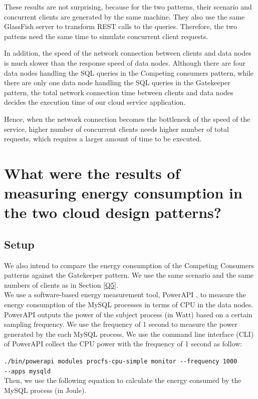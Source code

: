 \documentclass{article}
\begin{document}
These results are not surprising, because for the two patterns, their scenario and concurrent clients are generated by the same machine. They also use the same GlassFish server to transform REST calls to the queries. Therefore, the two pattens need the same time to simulate concurrent client requests. 

In addition, the speed of the network connection between clients and data nodes is much slower than the response speed of data nodes.
Although there are four data nodes handling the SQL queries in the Competing consumers pattern, while there are only one data node handling the SQL queries in the Gatekeeper pattern, the total network connection time between clients and data nodes decides the execution time of our cloud service application.

Hence, when the network connection becomes the bottleneck of the speed of the service, higher number of concurrent clients needs higher number of total requests, which requires a larger amount of time to be executed.

\section{What were the results of measuring energy consumption in the two cloud design patterns?}\label{Q6}
\subsection{Setup}
We also intend to compare the energy consumption of the Competing Consumers patterns against the Gatekeeper pattern. We use the same scenario and the same numbers of clients as in Section \ref{Q5}.\\

We use a software-based energy measurement tool, PowerAPI \cite{noureddine2012preliminary}, to measure the energy consumption of the MySQL processes in terms of CPU in the data nodes. PowerAPI outputs the power of the subject process (in Watt) based on a certain sampling frequency. We use the frequency of 1 second to measure the power generated by the each MySQL process. We use the command line interface (CLI) of PowerAPI collect the CPU power with the frequency of 1 second as follow:

\texttt{./bin/powerapi modules procfs-cpu-simple monitor -{}-frequency 1000 \\-{}-apps mysqld}\\

Then, we use the following equation to calculate the energy consumed by the MySQL process (in Joule).
\end{document}
